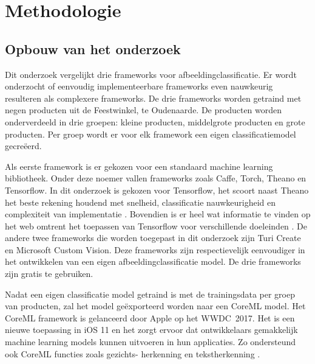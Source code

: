 
\chapter{Methodologie}
\label{ch:methodologie}


\section{Opbouw van het onderzoek}
\label{sec:Opbouw van het onderzoek}

Dit onderzoek vergelijkt drie frameworks voor afbeeldingclassificatie. Er wordt onderzocht of eenvoudig implementeerbare frameworks even nauwkeurig resulteren als complexere frameworks. De drie frameworks worden getraind met negen producten uit de Feestwinkel, te Oudenaarde. De producten worden onderverdeeld in drie groepen: kleine producten, middelgrote producten en grote producten. Per groep wordt er voor elk framework een eigen classificatiemodel gecreëerd.

Als eerste framework is er gekozen voor een standaard machine learning bibliotheek. Onder deze noemer vallen frameworks zoals Caffe, Torch, Theano en Tensorflow. In dit onderzoek is gekozen voor Tensorflow, het scoort naast Theano het beste rekening houdend met snelheid, classificatie nauwkeurigheid en complexiteit van implementatie \autocite{researchgate}. Bovendien is er heel wat informatie te vinden op het web omtrent het toepassen van Tensorflow voor verschillende doeleinden \autocite{huyen}. De andere twee frameworks die worden toegepast in dit onderzoek zijn Turi Create en Microsoft Custom Vision. Deze frameworks zijn respectievelijk eenvoudiger in het ontwikkelen van een eigen afbeeldingclassificatie model. De drie frameworks zijn gratis te gebruiken. 

Nadat een eigen classificatie model getraind is met de trainingsdata per groep van producten, zal het model geëxporteerd worden naar een CoreML model. Het CoreML framework is gelanceerd door Apple op het \acrshort{WWDC} 2017. Het is een nieuwe toepassing in iOS 11 en het zorgt ervoor dat ontwikkelaars gemakkelijk machine learning models kunnen uitvoeren in hun applicaties. Zo ondersteund ook CoreML functies zoals gezichts- herkenning en tekstherkenning \autocite{coreml}. 

